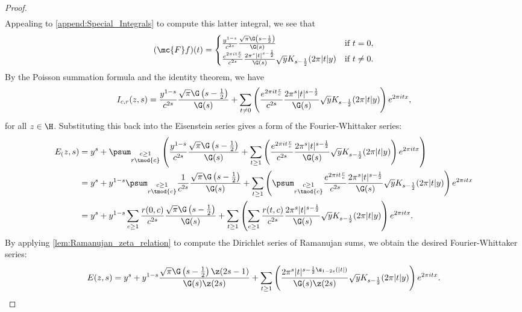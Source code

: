 \begin{proof}
\begin{align*}
        \end{align*}
        Appealing to \cref{append:Special_Integrals} to compute this latter integral, we see that
        \[
          (\mc{F}f)(t) = \begin{cases} \frac{y^{1-s}}{c^{2s}}\frac{\sqrt{\pi}\G\left(s-\frac{1}{2}\right)}{\G(s)} & \text{if $t = 0$}, \\ \frac{e^{2\pi it\frac{r}{c}}}{c^{2s}}\frac{2\pi^{s}|t|^{s-\frac{1}{2}}}{\G(s)}\sqrt{y}K_{s-\frac{1}{2}}(2\pi|t|y) & \text{if $t \neq 0$}. \end{cases}
        \]
        By the Poisson summation formula and the identity theorem, we have
        \[
          I_{c,r}(z,s) = \frac{y^{1-s}}{c^{2s}}\frac{\sqrt{\pi}\G\left(s-\frac{1}{2}\right)}{\G(s)}+\sum_{t \neq 0}\left(\frac{e^{2\pi it\frac{r}{c}}}{c^{2s}}\frac{2\pi^{s}|t|^{s-\frac{1}{2}}}{\G(s)}\sqrt{y}K_{s-\frac{1}{2}}(2\pi|t|y)\right)e^{2\pi itx},
        \]
        for all $z \in \H$. Substituting this back into the Eisenstein series gives a form of the Fourier-Whittaker series:
      \begin{align*}
        E_(z,s) &= y^{s}+\psum_{\substack{c \ge 1 \\ r \tmod{c}}}\left(\frac{y^{1-s}}{c^{2s}}\frac{\sqrt{\pi}\G\left(s-\frac{1}{2}\right)}{\G(s)}+\sum_{t \ge 1}\left(\frac{e^{2\pi it\frac{r}{c}}}{c^{2s}}\frac{2\pi^{s}|t|^{s-\frac{1}{2}}}{\G(s)}\sqrt{y}K_{s-\frac{1}{2}}(2\pi|t|y)\right)e^{2\pi itx}\right) \\
        &= y^{s}+y^{1-s}\psum_{\substack{c \ge 1 \\ r \tmod{c}}}\frac{1}{c^{2s}}\frac{\sqrt{\pi}\G\left(s-\frac{1}{2}\right)}{\G(s)}+\sum_{t \ge 1}\left(\psum_{\substack{c \ge 1 \\ r \tmod{c}}}\frac{e^{2\pi it\frac{r}{c}}}{c^{2s}}\frac{2\pi^{s}|t|^{s-\frac{1}{2}}}{\G(s)}\sqrt{y}K_{s-\frac{1}{2}}(2\pi|t|y)\right)e^{2\pi itx} \\
        &= y^{s}+y^{1-s}\sum_{c \ge 1}\frac{r(0,c)}{c^{2s}}\frac{\sqrt{\pi}\G\left(s-\frac{1}{2}\right)}{\G(s)}+\sum_{t \ge 1}\left(\sum_{c \ge 1}\frac{r(t,c)}{c^{2s}}\frac{2\pi^{s}|t|^{s-\frac{1}{2}}}{\G(s)}\sqrt{y}K_{s-\frac{1}{2}}(2\pi|t|y)\right)e^{2\pi itx}.
      \end{align*}
      By applying \cref{lem:Ramanujan_zeta_relation} to compute the Dirichlet series of Ramanujan sums, we obtain the desired Fourier-Whittaker series:
      \[
        E(z,s) = y^{s}+y^{1-s}\frac{\sqrt{\pi}\G\left(s-\frac{1}{2}\right)\z(2s-1)}{\G(s)\z(2s)}+\sum_{t \ge 1}\left(\frac{2\pi^{s}|t|^{s-\frac{1}{2}\s_{1-2s}(|t|)}}{\G(s)\z(2s)}\sqrt{y}K_{s-\frac{1}{2}}(2\pi|t|y)\right)e^{2\pi itx}.
      \]
      \end{proof}

